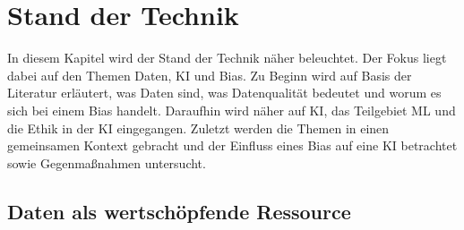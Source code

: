 \chapter{Stand der Technik}
\begin{onehalfspace}  
    \label{sec:theorie/standdertechnik}
        In diesem Kapitel wird der Stand der Technik näher beleuchtet. Der Fokus liegt dabei auf den Themen Daten, \ac{KI} und Bias. Zu Beginn wird auf Basis der Literatur erläutert, was Daten sind, was Datenqualität bedeutet und worum es sich bei einem Bias handelt. Daraufhin wird näher auf \ac{KI}, das Teilgebiet \ac{ML} und die Ethik in der \ac{KI} eingegangen. Zuletzt werden die Themen in einen gemeinsamen Kontext gebracht und der Einfluss eines Bias auf eine \ac{KI} betrachtet sowie Gegenmaßnahmen untersucht. 
    
    \section{Daten als wertschöpfende Ressource}
    \label{subsec:datenchapter}

\end{onehalfspace}
